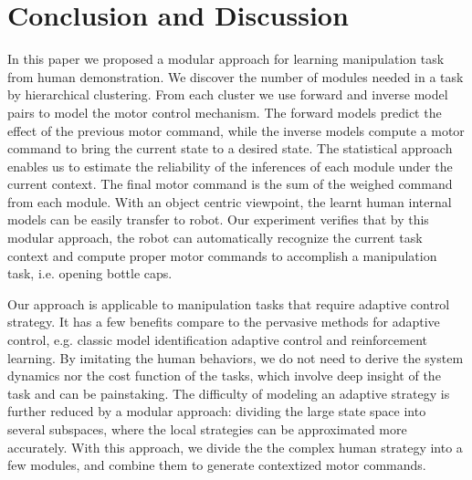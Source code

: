 \section{Conclusion and Discussion}
\label{sec:diss}
In this paper we proposed a modular approach for learning manipulation task from human demonstration. We discover the number of modules needed in a task by hierarchical clustering. From each cluster we use forward and inverse model pairs to model the motor control mechanism. The forward models predict the effect of the previous motor command, while the inverse models compute a motor command to bring the current state to a desired state. The statistical approach enables us to estimate the reliability of the inferences of each module under the current context. The final motor command is the sum of the weighed command from each module. With an object centric viewpoint, the learnt human internal models can be easily transfer to robot. Our experiment verifies that by this modular approach, the robot can automatically recognize the current task context and compute proper motor commands to accomplish a manipulation task, i.e. opening bottle caps.


Our approach is applicable to manipulation tasks that require adaptive control strategy. It has a few benefits compare to the pervasive methods for adaptive control, e.g. classic model identification adaptive control and reinforcement learning. By imitating the human behaviors, we do not need to derive the system dynamics nor the cost function of the tasks, which involve deep insight of the task and can be painstaking. The difficulty of modeling an adaptive strategy is further reduced by a modular approach: dividing the large state space into several subspaces, where the local strategies can be approximated more accurately. With this approach, we divide the the complex human strategy into a few modules, and combine them to generate contextized motor commands.

